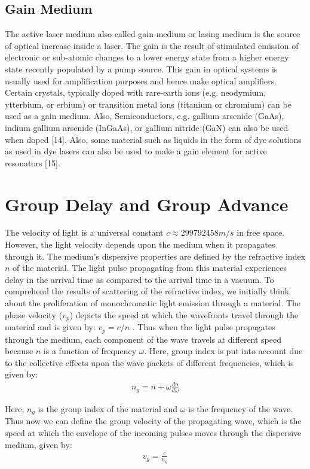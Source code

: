\subsection{Gain Medium}
The active laser medium also called gain medium or lasing medium is the source of optical increase inside a laser. The gain is the result of stimulated emission of electronic or sub-atomic changes to a lower energy state from a higher energy state recently populated by a pump source. This gain in optical systems is usually used for amplification purposes and hence make optical amplifiers. Certain crystals, typically doped with rare-earth ions (e.g. neodymium, ytterbium, or erbium) or transition metal ions (titanium or chromium) can be used as a gain medium. Also, Semiconductors, e.g. gallium arsenide (GaAs), indium gallium arsenide (InGaAs), or gallium nitride (GaN) can also be used when doped [14]. Also, some material such as liquids in the form of dye solutions as used in dye lasers can also be used to make a gain element for active resonators [15].


\section{Group Delay and Group Advance}
The velocity of light is a universal constant $c \approx 299792458 m/s$ in free space. However, the light velocity depends upon the medium when it propagates through it. The medium's dispersive properties are defined by the refractive index $n$ of the material. The light pulse propagating from this material experiences delay in the arrival time as compared to the arrival time in a vacuum. 
To comprehend the results of scattering of the refractive index, we initially think about the proliferation of monochromatic light emission through a material. The phase velocity ($v_{p}$) depicts the speed at which the wavefronts travel through the material and is given by: $v_{p} = c/n $ . Thus when the light pulse propagates through the medium, each component of the wave travels at different speed because $n$ is a function of frequency $\omega$. Here, group index is put into account due to the collective effects upon the wave packets of different frequencies, which is given by:
\begin{align*}
n_{g} = n + \omega\frac{dn}{d\omega}
\end{align*}

Here, $n_{g}$ is the group index of the material and $\omega$ is the frequency of the wave. Thus now we can define the group velocity of the propagating wave, which is the speed at which the envelope of the incoming pulses moves through the dispersive medium, given by:
\begin{align*}
v_{g} = \frac{c}{n_{g}}
\end{align*}

